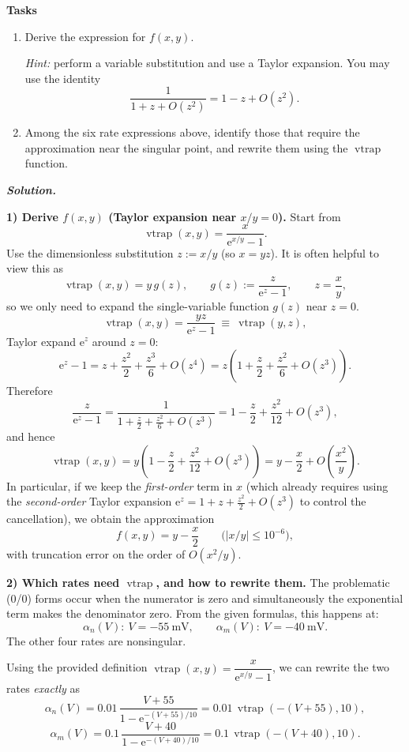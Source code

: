 \documentclass{article}
\newif\ifsolutionclearpage
\newenvironment{solution}{%
    \ifsolutionclearpage\clearpage\fi
    \global\solutionclearpagetrue
    \par\noindent\begin{solutionbox}\textbf{\textit{Solution.}}\par\medskip\itshape
}{%
    \end{solutionbox}
}
\renewenvironment{equation}{\begin{equation*}}{\end{equation*}}
\begin{document}
\textbf{Tasks}

\begin{enumerate}
\item Derive the expression for $f(x,y)$.

\textit{Hint:} perform a variable substitution and use a Taylor expansion.
You may use the identity
\[
\frac{1}{1+z+O(z^2)}=1-z+O(z^2).
\]

\item Among the six rate expressions above, identify those that require
the approximation near the singular point, and rewrite them using the
$\operatorname{vtrap}$ function.
\end{enumerate}

\begin{solution}
\textbf{1) Derive $f(x,y)$ (Taylor expansion near $x/y=0$).}
Start from
\[
\operatorname{vtrap}(x,y)=\frac{x}{\mathrm{e}^{x/y}-1}.
\]
Use the dimensionless substitution $z:=x/y$ (so $x=yz$). It is often helpful to view this as
\[
\operatorname{vtrap}(x,y)=y\,g(z),\qquad g(z):=\frac{z}{\mathrm{e}^{z}-1},\qquad z=\frac{x}{y},
\]
so we only need to expand the single-variable function $g(z)$ near $z=0$.
\[
\operatorname{vtrap}(x,y)=\frac{yz}{\mathrm{e}^{z}-1}\ \equiv\ \operatorname{vtrap}(y,z),
\]
Taylor expand $\mathrm{e}^{z}$ around $z=0$:
\[
\mathrm{e}^{z}-1=z+\frac{z^2}{2}+\frac{z^3}{6}+O(z^4)=z\left(1+\frac{z}{2}+\frac{z^2}{6}+O(z^3)\right).
\]
Therefore
\[
\frac{z}{\mathrm{e}^{z}-1}=\frac{1}{1+\frac{z}{2}+\frac{z^2}{6}+O(z^3)}
=1-\frac{z}{2}+\frac{z^2}{12}+O(z^3),
\]
and hence
\begin{equation}
\operatorname{vtrap}(x,y)=y\left(1-\frac{z}{2}+\frac{z^2}{12}+O(z^3)\right)
=y-\frac{x}{2}+O\!\left(\frac{x^2}{y}\right).
\end{equation}
In particular, if we keep the \emph{first-order} term in $x$ (which already requires using the \emph{second-order} Taylor expansion $\mathrm{e}^{z}=1+z+\tfrac{z^2}{2}+O(z^3)$ to control the cancellation), we obtain the approximation
\begin{equation}
f(x,y)=y-\frac{x}{2}
\qquad\bigl(|x/y|\le 10^{-6}\bigr),
\end{equation}
with truncation error on the order of $O(x^2/y)$.

\textbf{2) Which rates need $\operatorname{vtrap}$, and how to rewrite them.}
The problematic (0/0) forms occur when the numerator is zero and simultaneously the exponential term makes the denominator zero.
From the given formulas, this happens at:
\[
\alpha_n(V):\ V=\SI{-55}{\milli\volt},
\qquad
\alpha_m(V):\ V=\SI{-40}{\milli\volt}.
\]
The other four rates are nonsingular.

Using the provided definition $\operatorname{vtrap}(x,y)=\dfrac{x}{\mathrm{e}^{x/y}-1}$, we can rewrite the two rates \emph{exactly} as
\begin{equation}
\alpha_n(V)=0.01\,\frac{V+55}{1-\mathrm{e}^{-(V+55)/10}}
=0.01\,\operatorname{vtrap}(-(V+55),10),
\end{equation}
\begin{equation}
\alpha_m(V)=0.1\,\frac{V+40}{1-\mathrm{e}^{-(V+40)/10}}
=0.1\,\operatorname{vtrap}(-(V+40),10).
\end{equation}
\end{solution}
\end{document}
